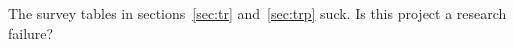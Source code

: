 
The survey tables in sections~\ref{sec:tr} and~\ref{sec:trp} suck. Is this
project a research failure? 
